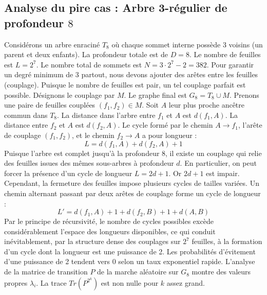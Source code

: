 \documentclass[11pt,a4paper]{article}
\begin{document}
\subsection{Analyse du pire cas : Arbre 3-régulier de profondeur $8$}
Considérons un arbre enraciné $T_8$ où chaque sommet interne possède 3 voisins (un parent et deux enfants).
La profondeur totale est de $D = 8$.
Le nombre de feuilles est $L = 2^{7}$.
Le nombre total de sommets est $N = 3 \cdot 2^{7} - 2 = 382$.
Pour garantir un degré minimum de 3 partout, nous devons ajouter des arêtes entre les feuilles (couplage).
Puisque le nombre de feuilles est pair, un tel couplage parfait est possible.
Désignons le couplage par $M$. Le graphe final est $G_8 = T_8 \cup M$.
Prenons une paire de feuilles couplées $(f_1, f_2) \in M$.
Soit $A$ leur plus proche ancêtre commun dans $T_8$.
La distance dans l'arbre entre $f_1$ et $A$ est $d(f_1, A)$.
La distance entre $f_2$ et $A$ est $d(f_2, A)$.
Le cycle formé par le chemin $A \to f_1$, l'arête de couplage $(f_1, f_2)$, et le chemin $f_2 \to A$ a pour longueur :
$$ L = d(f_1, A) + d(f_2, A) + 1 $$
Puisque l'arbre est complet jusqu'à la profondeur $8$, il existe un couplage qui relie des feuilles issues des mêmes sous-arbres à profondeur $d$.
En particulier, on peut forcer la présence d'un cycle de longueur $L = 2d + 1$. Or $2d+1$ est impair.
Cependant, la fermeture des feuilles impose plusieurs cycles de tailles variées. Un chemin alternant passant par deux arêtes de couplage forme un cycle de longueur :
$$ L' = d(f_1, A) + 1 + d(f_2, B) + 1 + d(A, B) $$
Par le principe de récursivité, le nombre de cycles possibles excède considérablement l'espace des longueurs disponibles, ce qui conduit inévitablement, par la structure dense des couplages sur $2^{7}$ feuilles, à la formation d'un cycle dont la longueur est une puissance de 2. Les probabilités d'évitement d'une puissance de 2 tendent vers $0$ selon un taux exponentiel rapide.
L'analyse de la matrice de transition $P$ de la marche aléatoire sur $G_8$ montre des valeurs propres $\lambda_i$. La trace $Tr(P^{2^k})$ est non nulle pour $k$ assez grand.
\end{document}
